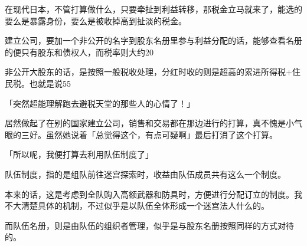 在现代日本，不管打算做什么，只要牵扯到利益转移，那税金立马就来了，能选的要么是暴露身份，要么是被收掉高到扯淡的税金。

建立公司，要加一个非公开的名字到股东名册里参与利益分配的话，能够查看名册的便只有股东和债权人，而税率则大约20%

非公开大股东的话，是按照一般税收处理，分红时收的则是超高的累进所得税+住民税。也就是说55%

「突然超能理解跑去避税天堂的那些人的心情了！」

居然做起了在别的国家建立公司，销售和交易都在那边进行的打算，真不愧是小气眼的三好。虽然她说着「总觉得这个，有点可疑啊」最后打消了这个打算。

「所以呢，我便打算去利用队伍制度了」

队伍制度，指的是组队前往迷宫探索时，收益由队伍成员共有这么一个制度。

本来的话，这是考虑到全队购入高额武器和防具时，方便进行分配订立的制度。我不大清楚具体的机制，不过似乎是以队伍全体形成一个迷宫法人什么的。

而队伍名册，则是由队伍的组织者管理，似乎是与股东名册按照同样的方式对待的。

